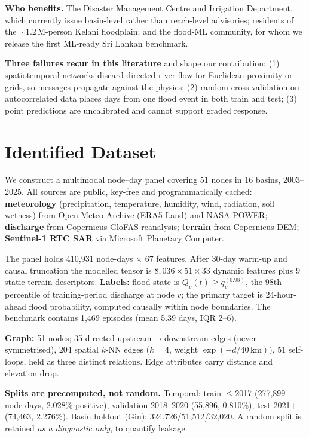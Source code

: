 \documentclass[sigconf]{acmart}
\begin{document}
\textbf{Who benefits.} The Disaster Management Centre and Irrigation Department, which currently issue basin-level rather than reach-level advisories; residents of the $\sim$1.2\,M-person Kelani floodplain; and the flood-ML community, for whom we release the first ML-ready Sri Lankan benchmark.

\textbf{Three failures recur in this literature} and shape our contribution: (1) spatiotemporal networks discard directed river flow for Euclidean proximity or grids, so messages propagate against the physics; (2) random cross-validation on autocorrelated data places days from one flood event in both train and test; (3) point predictions are uncalibrated and cannot support graded response.

\section{Identified Dataset}

We construct a multimodal node--day panel covering 51 nodes in 16 basins, 2003--2025. All sources are public, key-free and programmatically cached: \textbf{meteorology} (precipitation, temperature, humidity, wind, radiation, soil wetness) from Open-Meteo Archive (ERA5-Land) and NASA POWER; \textbf{discharge} from Copernicus GloFAS reanalysis; \textbf{terrain} from Copernicus DEM; \textbf{Sentinel-1 RTC SAR} via Microsoft Planetary Computer.

The panel holds 410,931 node-days $\times$ 67 features. After 30-day warm-up and causal truncation the modelled tensor is $8{,}036 \times 51 \times 33$ dynamic features plus 9 static terrain descriptors. \textbf{Labels:} flood state is $Q_v(t) \ge q_v^{(0.98)}$, the 98th percentile of training-period discharge at node $v$; the primary target is 24-hour-ahead flood probability, computed causally within node boundaries. The benchmark contains 1,469 episodes (mean 5.39 days, IQR 2--6).

\textbf{Graph:} 51 nodes; 35 directed upstream$\to$downstream edges (never symmetrised), 204 spatial $k$-NN edges ($k{=}4$, weight $\exp(-d/40\,\mathrm{km})$), 51 self-loops, held as three distinct relations. Edge attributes carry distance and elevation drop.

\textbf{Splits are precomputed, not random.} Temporal: train $\le$2017 (277,899 node-days, 2.028\% positive), validation 2018--2020 (55,896, 0.810\%), test 2021+ (74,463, 2.276\%). Basin holdout (Gin): 324,726/51,512/32,020. A random split is retained \emph{as a diagnostic only}, to quantify leakage.
\end{document}
